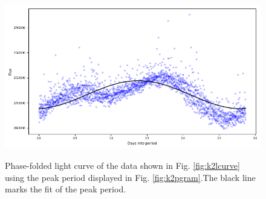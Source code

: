 \begin{figure}[!htbp]
\begin{center}
\includegraphics[scale=0.40]{k2/images/k2_pfold.png} \\
\vspace{-.5cm}
\end{center}   
\caption{Phase-folded light curve of the data shown in Fig. \ref{fig:k2lcurve}
using the peak period displayed in Fig. \ref{fig:k2pgram}.The black line marks
the fit of the peak period.}\protect\label{fig:k2pfold}
\end{figure}